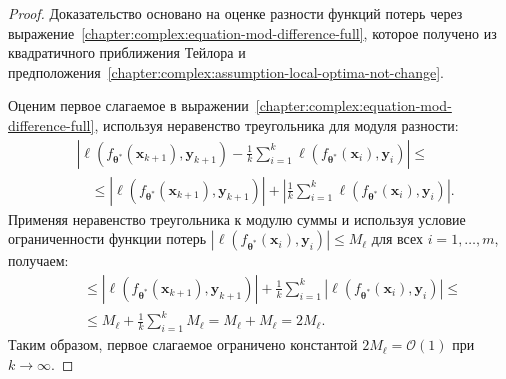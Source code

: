 \begin{proof}
    Доказательство основано на оценке разности функций потерь через выражение~\eqref{chapter:complex:equation-mod-difference-full}, которое получено из квадратичного приближения Тейлора и предположения~\ref{chapter:complex:assumption-local-optima-not-change}.

    Оценим первое слагаемое в выражении~\eqref{chapter:complex:equation-mod-difference-full}, используя неравенство треугольника для модуля разности:
    \begin{align}
        & \left| \ell(f_{\boldsymbol{\theta}^*}(\mathbf{x}_{k+1}), \mathbf{y}_{k+1}) - \frac{1}{k} \sum\limits_{i=1}^{k} \ell(f_{\boldsymbol{\theta}^*}(\mathbf{x}_{i}), \mathbf{y}_{i}) \right| \leqslant \\
        &\quad\leqslant \left| \ell(f_{\boldsymbol{\theta}^*}(\mathbf{x}_{k+1}), \mathbf{y}_{k+1}) \right| + \left| \frac{1}{k} \sum\limits_{i=1}^{k} \ell(f_{\boldsymbol{\theta}^*}(\mathbf{x}_{i}), \mathbf{y}_{i}) \right|.
    \end{align}
    Применяя неравенство треугольника к модулю суммы и используя условие ограниченности функции потерь $\left| \ell(f_{\boldsymbol{\theta}^*}(\mathbf{x}_{i}), \mathbf{y}_{i}) \right| \leqslant M_{\ell}$ для всех $i = 1, \ldots, m$, получаем:
    \begin{align}
        &\quad\leqslant \left| \ell(f_{\boldsymbol{\theta}^*}(\mathbf{x}_{k+1}), \mathbf{y}_{k+1}) \right| + \frac{1}{k} \sum\limits_{i=1}^{k} \left| \ell(f_{\boldsymbol{\theta}^*}(\mathbf{x}_{i}), \mathbf{y}_{i}) \right| \leqslant\\
        &\quad\leqslant M_{\ell} + \frac{1}{k} \sum\limits_{i=1}^{k} M_{\ell} = M_{\ell} + M_{\ell} = 2M_{\ell}.
    \end{align}
    Таким образом, первое слагаемое ограничено константой $2M_{\ell} = \mathcal{O}(1)$ при $k \to \infty$.


\end{proof}
